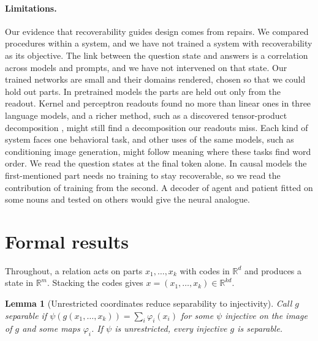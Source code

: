 \documentclass[10pt]{article}
\theoremstyle{plain}
\newtheorem{lemma}{Lemma}
\theoremstyle{remark}
\newcommand{\R}{\mathbb{R}}
\begin{document}
\paragraph{Limitations.} Our evidence that recoverability guides design comes from repairs. We compared procedures within a system, and we have not trained a system with recoverability as its objective. The link between the question state and answers is a correlation across models and prompts, and we have not intervened on that state. Our trained networks are small and their domains rendered, chosen so that we could hold out parts. In pretrained models the parts are held out only from the readout. Kernel and perceptron readouts found no more than linear ones in three language models, and a richer method, such as a discovered tensor-product decomposition \citep{soulos2020}, might still find a decomposition our readouts miss. Each kind of system faces one behavioral task, and other uses of the same models, such as conditioning image generation, might follow meaning where these tasks find word order. We read the question states at the final token alone. In causal models the first-mentioned part needs no training to stay recoverable, so we read the contribution of training from the second. A decoder of agent and patient \citep{frankland2015} fitted on some nouns and tested on others would give the neural analogue.

\FloatBarrier



\clearpage
\appendix
\makeatletter\let\@fb@secFB\relax\makeatother %

\section{Formal results}
\label{app:proofs}

Throughout, a relation acts on parts $x_1, \ldots, x_k$ with codes in $\R^d$ and produces a state in $\R^m$. Stacking the codes gives $x = (x_1, \ldots, x_k) \in \R^{kd}$.



\begin{lemma}[Unrestricted coordinates reduce separability to injectivity]
\label{lem:psi}
Call $g$ separable if $\psi(g(x_1, \ldots, x_k)) = \sum_i \varphi_i(x_i)$ for some $\psi$ injective on the image of $g$ and some maps $\varphi_i$. If $\psi$ is unrestricted, every injective $g$ is separable.
\end{lemma}
\end{document}
